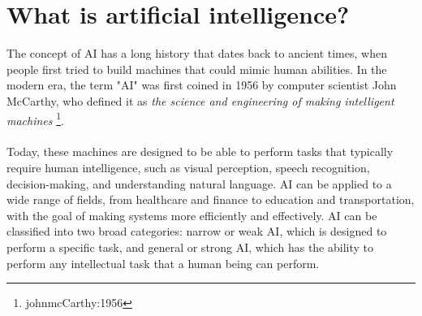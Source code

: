 \section{What is artificial intelligence?}
The concept of AI has a long history that dates back to ancient times, when people first tried to build machines that could mimic human abilities. In the modern era, the term "AI" was first coined in 1956 by computer scientist John McCarthy, who defined it as \textit{the science and engineering of making intelligent machines} \footnote{johnmcCarthy:1956}.
\\
\\
Today, these machines are designed to be able to perform tasks that typically require human intelligence, such as visual perception, speech recognition, decision-making, and understanding natural language. AI can be applied to a wide range of fields, from healthcare and finance to education and transportation, with the goal of making systems more efficiently and effectively. AI can be classified into two broad categories: narrow or weak AI, which is designed to perform a specific task, and general or strong AI, which has the ability to perform any intellectual task that a human being can perform.

